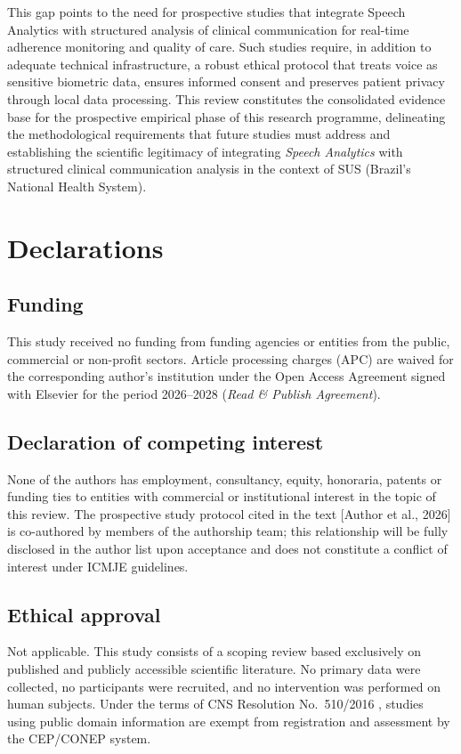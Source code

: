 \documentclass[review,12pt]{elsarticle}
\begin{document}
This gap points to the need for prospective studies that integrate Speech
Analytics with structured analysis of clinical communication for real-time
adherence monitoring and quality of care.
Such studies require, in addition to adequate technical infrastructure, a
robust ethical protocol that treats voice as sensitive biometric data, ensures
informed consent and preserves patient privacy through local data processing.
This review constitutes the consolidated evidence base for the prospective
empirical phase of this research programme, delineating the methodological
requirements that future studies must address and establishing the
scientific legitimacy of integrating \textit{Speech Analytics} with
structured clinical communication analysis in the context of SUS
(Brazil's National Health System).

\section*{Declarations}

\subsection*{Funding}
This study received no funding from funding agencies or entities from the
public, commercial or non-profit sectors.
Article processing charges (APC) are waived for the corresponding author's
institution under the Open Access Agreement signed with Elsevier for the
period 2026--2028 (\textit{Read \& Publish Agreement}).

\subsection*{Declaration of competing interest}
None of the authors has employment, consultancy, equity, honoraria, patents
or funding ties to entities with commercial or institutional interest in the
topic of this review.
The prospective study protocol cited in the text [Author et al., 2026] is
co-authored by members of the authorship team; this relationship will be
fully disclosed in the author list upon acceptance and does not constitute
a conflict of interest under ICMJE guidelines.

\subsection*{Ethical approval}
Not applicable. This study consists of a scoping review based exclusively on
published and publicly accessible scientific literature. No primary data were
collected, no participants were recruited, and no intervention was performed
on human subjects.
Under the terms of CNS Resolution No.~510/2016 \citep{CNS510_2016}, studies
using public domain information are exempt from registration and assessment
by the CEP/CONEP system.
\end{document}
